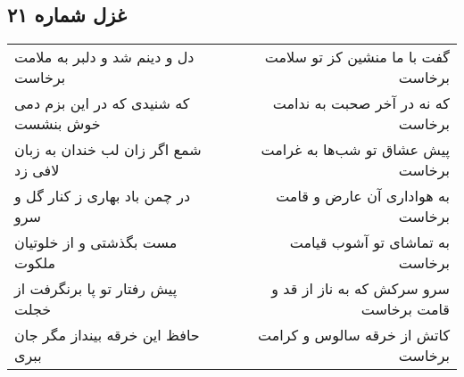 \begin{center}
\section*{غزل شماره ۲۱}
\label{sec:sh021}
\begin{longtable}{l p{0.5cm} r}
دل و دینم شد و دلبر به ملامت برخاست
&&
گفت با ما منشین کز تو سلامت برخاست
\\
که شنیدی که در این بزم دمی خوش بنشست
&&
که نه در آخر صحبت به ندامت برخاست
\\
شمع اگر زان لب خندان به زبان لافی زد
&&
پیش عشاق تو شب‌ها به غرامت برخاست
\\
در چمن باد بهاری ز کنار گل و سرو
&&
به هواداری آن عارض و قامت برخاست
\\
مست بگذشتی و از خلوتیان ملکوت
&&
به تماشای تو آشوب قیامت برخاست
\\
پیش رفتار تو پا برنگرفت از خجلت
&&
سرو سرکش که به ناز از قد و قامت برخاست
\\
حافظ این خرقه بینداز مگر جان ببری
&&
کاتش از خرقه سالوس و کرامت برخاست
\\
\end{longtable}
\end{center}
